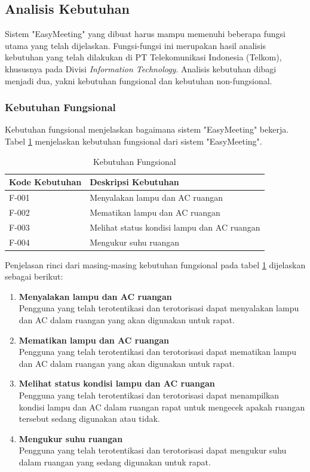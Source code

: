 \subsection{Analisis Kebutuhan}
\tab Sistem "EasyMeeting" yang dibuat harus mampu memenuhi beberapa fungsi utama yang telah dijelaskan. Fungsi-fungsi ini merupakan hasil analisis kebutuhan yang telah dilakukan di PT Telekomunikasi Indonesia (Telkom), khususnya pada Divisi \textit{Information Technology}. Analisis kebutuhan dibagi menjadi dua, yakni kebutuhan fungsional dan kebutuhan non-fungsional.

\subsubsection{Kebutuhan Fungsional}
\tab Kebutuhan fungsional menjelaskan bagaimana sistem "EasyMeeting" bekerja. Tabel \ref{table:kebutuhan_fungsional} menjelaskan kebutuhan fungsional dari sistem "EasyMeeting".

\begin{table}[H]
	\centering
	\begin{tabular}{ | p{3cm} | p{6cm} | }
		\hline
		\textbf{Kode Kebutuhan} & \textbf{Deskripsi Kebutuhan} \\ \hline
		F-001 & Menyalakan lampu dan AC ruangan \\ \hline
		F-002 & Mematikan lampu dan AC ruangan \\ \hline
		F-003 & Melihat status kondisi lampu dan AC ruangan \\ \hline
		F-004 & Mengukur suhu ruangan \\ \hline
	\end{tabular} \caption{Kebutuhan Fungsional}
	\label{table:kebutuhan_fungsional}
\end{table}

Penjelasan rinci dari masing-masing kebutuhan fungsional pada tabel \ref{table:kebutuhan_fungsional} dijelaskan sebagai berikut:
\begin{enumerate}
	\item \textbf{Menyalakan lampu dan AC ruangan} \\
	\tab Pengguna yang telah terotentikasi dan terotorisasi dapat menyalakan lampu dan AC dalam ruangan yang akan digunakan untuk rapat.
	\item \textbf{Mematikan lampu dan AC ruangan} \\
	\tab Pengguna yang telah terotentikasi dan terotorisasi dapat mematikan lampu dan AC dalam ruangan yang akan digunakan untuk rapat.
	\item \textbf{Melihat status kondisi lampu dan AC ruangan} \\
	\tab Pengguna yang telah terotentikasi dan terotorisasi dapat menampilkan kondisi lampu dan AC dalam ruangan rapat untuk mengecek apakah ruangan tersebut sedang digunakan atau tidak.
	\item \textbf{Mengukur suhu ruangan} \\
	\tab Pengguna yang telah terotentikasi dan terotorisasi dapat mengukur suhu dalam ruangan yang sedang digunakan untuk rapat.
\end{enumerate}

